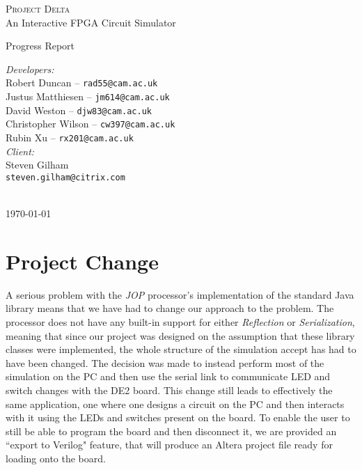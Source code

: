 \documentclass[12pt, a4paper, oneside,titlepage]{article}
\begin{document}
 \begin{titlepage}
 \begin{center}
 \textsc{\huge{Project Delta}} \\
 {\Large{An Interactive FPGA Circuit Simulator}}
\end{center}
\vspace{10em}
 \begin{center}
{\huge{Progress Report}}
\end{center}
\vfill
\setlength{\columnsep}{10em}
\begin{multicols}{2}{
\emph{Developers:}\\
Robert Duncan -- \texttt{rad55@cam.ac.uk} \\
Justus Matthiesen -- \texttt{jm614@cam.ac.uk}\\
David Weston -- \texttt{djw83@cam.ac.uk}\\
Christopher Wilson -- \texttt{cw397@cam.ac.uk}\\
Rubin Xu -- \texttt{rx201@cam.ac.uk}\\
\emph{Client:}\\
Steven Gilham\\
\texttt{steven.gilham@citrix.com}
\\
\\
}
\end{multicols}
\begin{center}
\today
\end{center}
 \end{titlepage}

\tableofcontents
\newpage
\setlength{\parskip}{\medskipamount}
\section{Project Change}
A serious problem with the \emph{JOP} processor's implementation of the standard Java library means that we have had to change our approach to the problem.
The processor does not have any built-in support for either \emph{Reflection} or \emph{Serialization}, meaning that since our project was designed on the assumption that 
these library classes were implemented, the whole structure of the simulation accept has had to have been changed. The decision was made to instead perform
most of the simulation on the PC and then use the serial link to communicate LED and switch changes with the DE2 board. This change still leads to effectively
the same application, one where one designs a circuit on the PC and then interacts with it using the LEDs and switches present on the board. To enable the user to still be able to program the board and then disconnect it, we are provided an ``export to Verilog" feature, that will produce an Altera project file ready for loading onto the board. 
\end{document}
